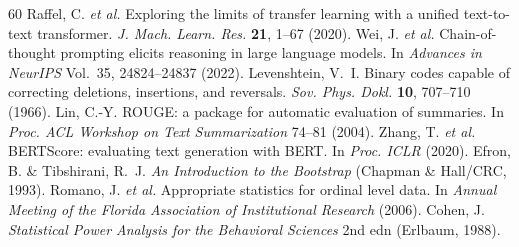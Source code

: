 \documentclass[sn-nature]{sn-jnl}
\begin{document}
\begin{thebibliography}{60}
Raffel, C. \emph{et al.}
Exploring the limits of transfer learning with a unified text-to-text transformer.
\emph{J. Mach. Learn. Res.} \textbf{21}, 1--67 (2020).
Wei, J. \emph{et al.}
Chain-of-thought prompting elicits reasoning in large language models.
In \emph{Advances in NeurIPS} Vol.~35, 24824--24837 (2022).
Levenshtein, V.~I.
Binary codes capable of correcting deletions, insertions, and reversals.
\emph{Sov. Phys. Dokl.} \textbf{10}, 707--710 (1966).
Lin, C.-Y.
ROUGE: a package for automatic evaluation of summaries.
In \emph{Proc. ACL Workshop on Text Summarization} 74--81 (2004).
Zhang, T. \emph{et al.}
BERTScore: evaluating text generation with BERT.
In \emph{Proc. ICLR} (2020).
Efron, B. \& Tibshirani, R.~J.
\emph{An Introduction to the Bootstrap} (Chapman \& Hall/CRC, 1993).
Romano, J. \emph{et al.}
Appropriate statistics for ordinal level data.
In \emph{Annual Meeting of the Florida Association of Institutional Research} (2006).
Cohen, J.
\emph{Statistical Power Analysis for the Behavioral Sciences} 2nd edn (Erlbaum, 1988).

\end{thebibliography}
\end{document}
